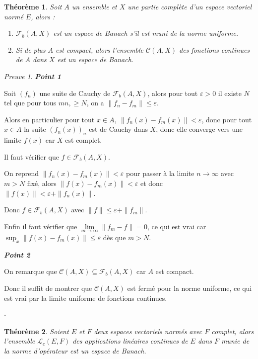 \documentclass[]{article}
\newtheorem{mythm}{Théorème}
\theoremstyle{remark}
\newtheorem{myproof}{Preuve}
\theoremstyle{definition}
\newcommand{\cqfd}{
	\hfill$\square$
}
\newenvironment{proofpart}[1]{
	\leavevmode
	
	\noindent
	{\textit{\textbf{\boldmath #1}}}
	
}{
	\checkmark
}
\begin{document}
\begin{mythm}
	Soit $A$ un ensemble et $X$ une partie complète d'un espace vectoriel normé $E$, alors :
	\begin{enumerate}
		\item $\mathcal{F}_b(A, X)$ est un espace de Banach s'il est muni de la norme uniforme.
		
		\item Si de plus $A$ est compact, alors l'ensemble $\mathcal{C}(A, X)$ des fonctions continues de $A$ dans $X$ est un espace de Banach.
	\end{enumerate}
\end{mythm}

\begin{myproof}
	\begin{proofpart}{Point 1}
		Soit $(f_n)$ une suite de Cauchy de $\mathcal{F}_b(A, X)$, alors pour tout $\varepsilon > 0$ il existe $N$ tel que pour tous $mn , \geqslant N$, on a $\|f_n - f_m\| \leqslant \varepsilon$.
		
		Alors en particulier pour tout $x \in A, ~ \|f_n(x) - f_m(x)\| < \varepsilon$, donc pour tout $x \in A$ la suite $(f_n(x))_n$ est de Cauchy dans $X$, donc elle converge vers une limite $f(x)$ car $X$ est complet.
		
		Il faut vérifier que $f \in \mathcal{F}_b(A, X)$.
		
		On reprend $\|f_n(x) - f_m(x)\| < \varepsilon$ pour passer à la limite $n \rightarrow \infty$ avec $m > N$ fixé, alors $\|f(x)-f_m(x)\| < \varepsilon$ et donc $\|f(x)\| < \varepsilon + \|f_n(x)\|$.
		
		Donc $f \in \mathcal{F}_b(A, X)$ avec $\|f\| \leqslant \varepsilon + \|f_m\|$.
		
		Enfin il faut vérifier que $\lim\limits_{m \to \infty} \|f_m - f\| = 0$, ce qui est vrai car $\sup_x \|f(x) - f_m(x)\| \leqslant \varepsilon$ dès que $m > N$.
	\end{proofpart}
	
	\begin{proofpart}{Point 2}
		On remarque que $\mathcal{C}(A, X) \subseteq \mathcal{F}_b(A, X)$ car $A$ est compact.
		
		Donc il suffit de montrer que $\mathcal{C}(A, X)$ est fermé pour la norme uniforme, ce qui est vrai par la limite uniforme de fonctions continues.
	\end{proofpart}
	
	\cqfd
\end{myproof}

\begin{mythm}
	Soient $E$ et $F$ deux espaces vectoriels normés avec $F$ complet, alors l'ensemble $\mathcal{L}_c(E, F)$ des applications linéaires continues de $E$ dans $F$ munie de la norme d'opérateur est un espace de Banach.
\end{mythm}
\end{document}
